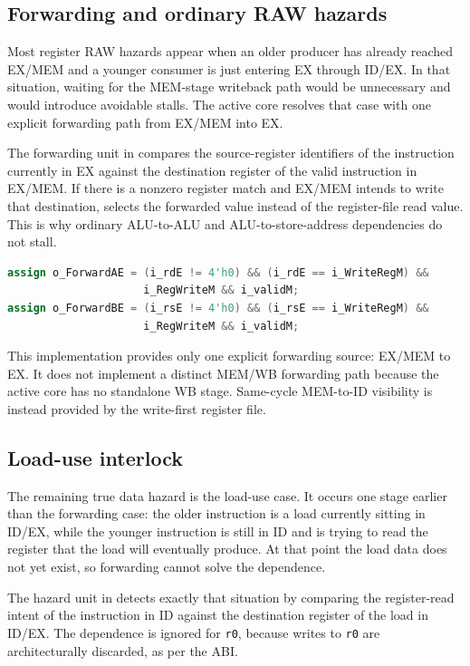 \documentclass[11pt,a4paper]{article}
\begin{document}
\subsection{Forwarding and ordinary RAW hazards}

Most register RAW hazards appear when an older producer has already reached EX/MEM and a younger consumer is just entering EX through ID/EX. In that situation, waiting for the MEM-stage writeback path would be unnecessary and would introduce avoidable stalls. The active core resolves that case with one explicit forwarding path from EX/MEM into EX.

The forwarding unit in  compares the source-register identifiers of the instruction currently in EX against the destination register of the valid instruction in EX/MEM. If there is a nonzero register match and EX/MEM intends to write that destination,  selects the forwarded value instead of the register-file read value. This is why ordinary ALU-to-ALU and ALU-to-store-address dependencies do not stall.

\begin{lstlisting}[language=Verilog,caption={EX/MEM forwarding in \texttt{srcs/m\_forwarding.v}}]
assign o_ForwardAE = (i_rdE != 4'h0) && (i_rdE == i_WriteRegM) &&
                     i_RegWriteM && i_validM;
assign o_ForwardBE = (i_rsE != 4'h0) && (i_rsE == i_WriteRegM) &&
                     i_RegWriteM && i_validM;
\end{lstlisting}

This implementation provides only one explicit forwarding source: EX/MEM to EX. It does not implement a distinct MEM/WB forwarding path because the active core has no standalone WB stage. Same-cycle MEM-to-ID visibility is instead provided by the write-first register file.\cite{stanfordhazards}

\subsection{Load-use interlock}

The remaining true data hazard is the load-use case. It occurs one stage earlier than the forwarding case: the older instruction is a load currently sitting in ID/EX, while the younger instruction is still in ID and is trying to read the register that the load will eventually produce. At that point the load data does not yet exist, so forwarding cannot solve the dependence.

The hazard unit in  detects exactly that situation by comparing the register-read intent of the instruction in ID against the destination register of the load in ID/EX. The dependence is ignored for \texttt{r0}, because writes to \texttt{r0} are architecturally discarded, as per the ABI.
\end{document}
